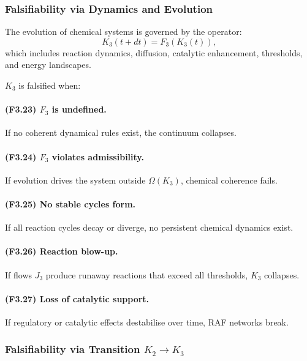 \subsubsection{Falsifiability via Dynamics and Evolution}

The evolution of chemical systems is governed by the operator:
\[
K_3(t+dt) = F_3(K_3(t)),
\]
which includes reaction dynamics, diffusion, catalytic enhancement,
thresholds, and energy landscapes.

$K_3$ is falsified when:

\paragraph{(F3.23) \texorpdfstring{$F_3$}{F_3} is undefined.}
If no coherent dynamical rules exist, the continuum collapses.

\paragraph{(F3.24) \texorpdfstring{$F_3$}{F_3} violates admissibility.}
If evolution drives the system outside $\Omega(K_3)$, chemical coherence
fails.

\paragraph{(F3.25) No stable cycles form.}
If all reaction cycles decay or diverge, no persistent chemical dynamics
exist.

\paragraph{(F3.26) Reaction blow-up.}
If flows $J_3$ produce runaway reactions that exceed all thresholds,
$K_3$ collapses.

\paragraph{(F3.27) Loss of catalytic support.}
If regulatory or catalytic effects destabilise over time, RAF networks
break.



\subsubsection{Falsifiability via Transition \texorpdfstring{$K_2 \to K_3$}{K_2 \to K_3}}

